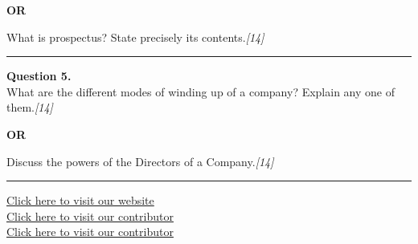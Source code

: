 \documentclass[11pt,a4paper]{article}
\newcommand{\pts}[1]{\hfill   \textit{[#1]}}
\begin{document}
\centerline{   \textbf{OR}}

What is prospectus? State precisely its contents.\pts{14}

\medskip\rule{\linewidth}{0.2pt}




\noindent   \textbf{Question 5.} \\
What are the different modes of winding up of a company? Explain any one of them.\pts{14}

\centerline{   \textbf{OR}}

Discuss the powers of the Directors of a Company.\pts{14}

\vfill
\rule{\linewidth}{0.4pt}

\begin{center}\small
\href{https://bhu-exam.vercel.app/}{Click here to visit our website}\\[4pt]
\href{https://me-aryan.vercel.app/}{Click here to visit our contributor}\\[4pt]
\href{https://quashan-me.vercel.app/}{Click here to visit our contributor}
\end{center}
\end{document}
